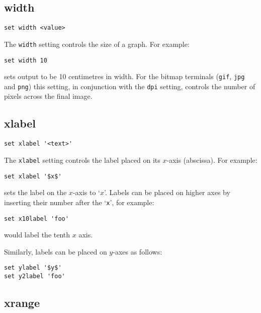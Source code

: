\documentclass[a4paper,onecolumn,11pt]{book}
\begin{document}
\subsection{width}

\begin{verbatim}
set width <value>
\end{verbatim}

The {\tt width} setting controls the size of a graph.  For example:

\begin{verbatim}
set width 10
\end{verbatim}

\noindent sets output to be 10 centimetres in width.  For the bitmap terminals ({\tt gif},
{\tt jpg} and {\tt png}) this setting, in conjunction with the {\tt dpi}
setting, controls the number of pixels across the final image.

\subsection{xlabel}

\begin{verbatim}
set xlabel '<text>'
\end{verbatim}

The {\tt xlabel} setting controls the label placed on its $x$-axis (abscissa).
For example:

\begin{verbatim}
set xlabel '$x$'
\end{verbatim}

\noindent sets the label on the $x$-axis to `$x$'.  Labels can be placed on higher axes by
inserting their number after the `\texttt{x}', for example:

\begin{verbatim}
set x10label 'foo'
\end{verbatim}

\noindent would label the tenth $x$ axis.

Similarly, labels can be placed on $y$-axes as follows:

\begin{verbatim}
set ylabel '$y$' 
set y2label 'foo'
\end{verbatim}


\subsection{xrange}
\end{document}

